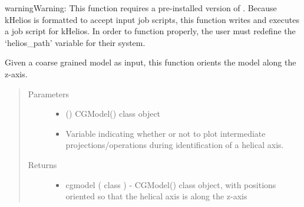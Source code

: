 \documentclass[letterpaper,12pt,english,openany,oneside]{sphinxmanual}
\begin{document}
\begin{fulllineitems}
\begin{quote}
\begin{description}
\begin{itemize}
\end{itemize}


\end{description}\end{quote}

\begin{sphinxadmonition}{warning}{Warning:}
This function requires a pre-installed version of  .  Because kHelios is formatted to accept input job scripts, this function writes and executes a job script for kHelios.  In order to function properly, the user must redefine the ‘helios\_path’ variable for their system.
\end{sphinxadmonition}

\end{fulllineitems}


\begin{fulllineitems}
\label{\detokenize{parameters:parameters.secondary_structure.orient_along_z_axis}}
Given a coarse grained model as input, this function orients the model along the z-axis.
\begin{quote}\begin{description}
\item[{Parameters}] \leavevmode\begin{itemize}
\item {} 
 () \textendash{} CGModel() class object

\item {} 
 \textendash{} Variable indicating whether or not to plot intermediate projections/operations during identification of a helical axis.

\end{itemize}

\item[{Returns}] \leavevmode
\begin{itemize}
\item {} 
cgmodel ( class ) - CGModel() class object, with positions oriented so that the helical axis is along the z-axis

\end{itemize}


\end{description}\end{quote}

\end{fulllineitems}
\end{document}
